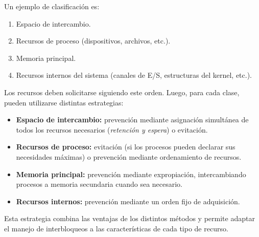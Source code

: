 Un ejemplo de clasificación es:
\begin{enumerate}
  \item Espacio de intercambio.
  \item Recursos de proceso (dispositivos, archivos, etc.).
  \item Memoria principal.
  \item Recursos internos del sistema (canales de E/S, estructuras del kernel, etc.).
\end{enumerate}

Los recursos deben solicitarse siguiendo este orden. Luego, para cada clase, pueden utilizarse distintas estrategias:
\begin{itemize}
  \item \textbf{Espacio de intercambio:} prevención mediante asignación simultánea de todos los recursos necesarios (\textit{retención y espera}) o evitación.
  \item \textbf{Recursos de proceso:} evitación (si los procesos pueden declarar sus necesidades máximas) o prevención mediante ordenamiento de recursos.
  \item \textbf{Memoria principal:} prevención mediante expropiación, intercambiando procesos a memoria secundaria cuando sea necesario.
  \item \textbf{Recursos internos:} prevención mediante un orden fijo de adquisición.
\end{itemize}

Esta estrategia combina las ventajas de los distintos métodos y permite adaptar el manejo de interbloqueos a las características de cada tipo de recurso.
